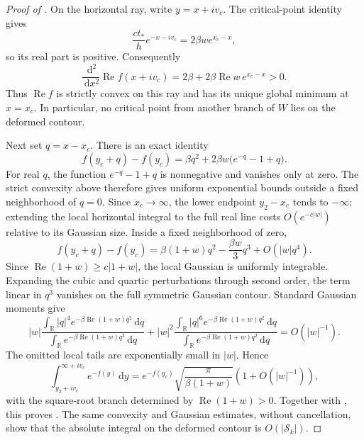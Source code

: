 \documentclass[11pt]{article}
\newcommand{\R}{\mathbb R}
\newcommand{\dd}{\,\mathrm d}
\newcommand{\Rea}{\operatorname{Re}}
\begin{document}
\begin{proof}[Proof of ]
On the horizontal ray, write $y=x+iv_c$.  The critical-point identity gives
\begin{equation}\label{eq:horizontal-exponential}
 \frac{ct_*}{h}e^{-x-iv_c}
 =2\beta w e^{x_c-x},
\end{equation}
so its real part is positive.  Consequently
\[
 \frac{\dd^2}{\dd x^2}\Rea f(x+iv_c)
 =2\beta+2\beta\Rea w\,e^{x_c-x}>0.
\]
Thus $\Rea f$ is strictly convex on this ray and has its unique global
minimum at $x=x_c$.  In particular, no critical point from another branch of
$W$ lies on the deformed contour.

Next set $q=x-x_c$.  There is an exact identity
\begin{equation}\label{eq:saddle-difference-exact}
 f(y_c+q)-f(y_c)
 =\beta q^2+2\beta w\bigl(e^{-q}-1+q\bigr).
\end{equation}
For real $q$, the function $e^{-q}-1+q$ is nonnegative and vanishes only at
zero.  The strict convexity above therefore gives uniform exponential bounds
outside a fixed neighborhood of $q=0$.  Since $x_c\to\infty$, the lower
endpoint $y_2-x_c$ tends to $-\infty$; extending the local horizontal
integral to the full real line costs $O(e^{-c|w|})$ relative to its Gaussian
size.  Inside a fixed neighborhood of zero,
\begin{equation}\label{eq:saddle-local-expansion}
 f(y_c+q)-f(y_c)
 =\beta(1+w)q^2-\frac{\beta w}{3}q^3+O(|w|q^4).
\end{equation}
Since $\Rea(1+w)\ge c|1+w|$, the local Gaussian is uniformly integrable.
Expanding the cubic and quartic perturbations through second order, the term
linear in $q^3$ vanishes on the full symmetric Gaussian contour.  Standard
Gaussian moments give
\[
 |w|\frac{\int_{\R}|q|^4e^{-\beta\Rea(1+w)q^2}\dd q}
              {\int_{\R}e^{-\beta\Rea(1+w)q^2}\dd q}
 +|w|^2\frac{\int_{\R}|q|^6e^{-\beta\Rea(1+w)q^2}\dd q}
                {\int_{\R}e^{-\beta\Rea(1+w)q^2}\dd q}
 =O(|w|^{-1}).
\]
The omitted local tails are exponentially small in $|w|$.  Hence
\[
 \int_{y_2+iv_c}^{\infty+iv_c}e^{-f(y)}\dd y
 =e^{-f(y_c)}\sqrt{\frac{\pi}{\beta(1+w)}}
  \left(1+O(|w|^{-1})\right),
\]
with the square-root branch determined by $\Rea(1+w)>0$.  Together with
, this proves .  The same convexity and
Gaussian estimates, without cancellation, show that the absolute integral
on the deformed contour is $O(|\mathcal S_k|)$.


\end{proof}
\end{document}

